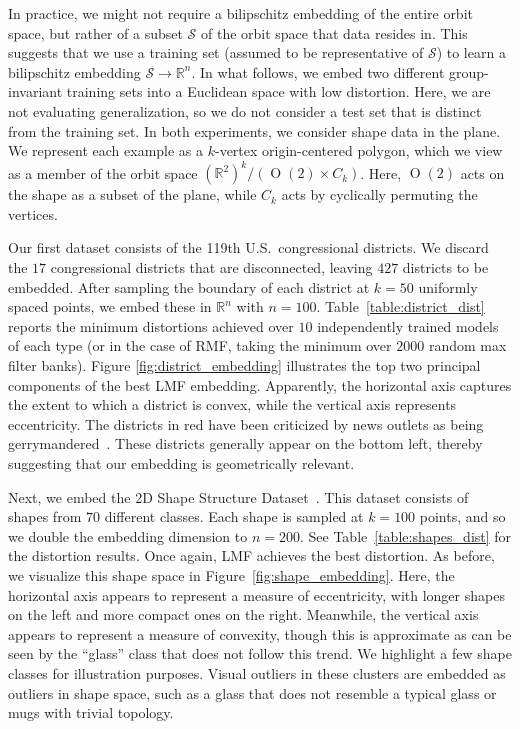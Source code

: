 \documentclass{article}
\theoremstyle{plain}
\theoremstyle{definition}
\begin{document}
{In practice, we might not require a bilipschitz embedding of the entire orbit space, but rather of a subset $\mathcal{S}$ of the orbit space that data resides in.
This suggests that we use a training set (assumed to be representative of $\mathcal{S}$) to learn a bilipschitz embedding $\mathcal{S}\to\mathbb{R}^n$.
In what follows, we embed two different group-invariant training sets into a Euclidean space with low distortion. 
Here, we are not evaluating generalization, so we do not consider a test set that is distinct from the training set.
In both experiments, we consider shape data in the plane. 
We represent each example as a $k$-vertex origin-centered polygon, which we view as a member of the orbit space $(\mathbb{R}^{2})^{k}/(\operatorname{O}(2) \times C_{k})$.
Here, $\operatorname{O}(2)$ acts on the shape as a subset of the plane, while $C_k$ acts by cyclically permuting the vertices. 

Our first dataset consists of the 119th U.S.\ congressional districts. 
We discard the $17$ congressional districts that are disconnected, leaving $427$ districts to be embedded.
After sampling the boundary of each district at $k=50$ uniformly spaced points, we embed these in $\mathbb{R}^n$ with $n=100$.
Table~\ref{table:district_dist} reports the minimum distortions achieved over $10$ independently trained models of each type (or in the case of RMF, taking the minimum over $2000$ random max filter banks).
Figure \ref{fig:district_embedding} illustrates the top two principal components of the best LMF embedding. 
Apparently, the horizontal axis captures the extent to which a district is convex, while the vertical axis represents eccentricity.
The districts in red have been criticized by news outlets as being gerrymandered~\cite{Buchholz:online,Meyers:online}.
These districts generally appear on the bottom left, thereby suggesting that our embedding is geometrically relevant.

Next, we embed the 2D Shape Structure Dataset~\cite{CarlierEtal:online}.
This dataset consists of shapes from $70$ different classes. 
Each shape is sampled at $k=100$ points, and so we double the embedding dimension to $n=200$.
See Table~\ref{table:shapes_dist} for the distortion results. 
Once again, LMF achieves the best distortion. 
As before, we visualize this shape space in Figure~\ref{fig:shape_embedding}. 
Here, the horizontal axis appears to represent a measure of eccentricity, with longer shapes on the left and more compact ones on the right. 
Meanwhile, the vertical axis appears to represent a measure of convexity, though this is approximate as can be seen by the ``glass'' class that does not follow this trend.
We highlight a few shape classes for illustration purposes. 
Visual outliers in these clusters are embedded as outliers in shape space, such as a glass that does not resemble a typical glass or mugs with trivial topology. 

}
\end{document}
